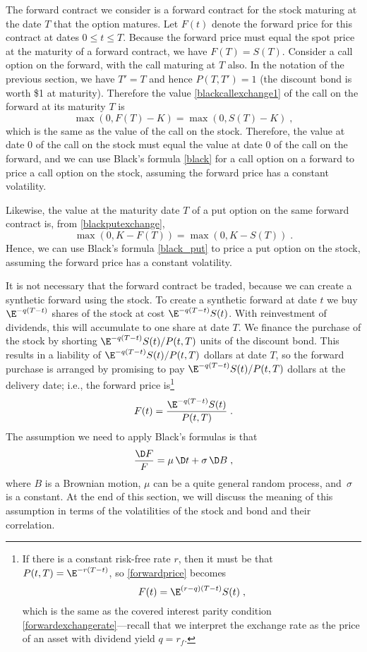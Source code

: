 The forward contract we consider is a forward contract for the stock maturing at the date $T$ that the option matures.  Let $F(t)$ denote the forward price for this contract at dates $0 \leq t\leq T$.  Because the forward price must equal the spot price at the maturity of a forward contract, we have $F(T)=S(T)$.  Consider a call option on the forward, with the call maturing at $T$ also.  In the notation of the previous section, we have $T'=T$ and hence $P(T,T')=1$ (the discount bond is worth \$1 at maturity).  Therefore the value \eqref{blackcallexchange1} of the call on the forward at its maturity $T$ is
$$\max(0,F(T)-K) = \max(0,S(T)-K)\; ,$$
which is the same as the value of the call on the stock.  Therefore, the value at date 0 of the call on the stock must equal the value at date 0 of the call on the forward, and we can use Black's formula \eqref{black} for a call option on a forward to price a call option on the stock, assuming the forward price has a constant volatility. 

Likewise, the value at the maturity date $T$ of a put option on the same forward contract is, from \eqref{blackputexchange},
$$\max(0,K-F(T)) = \max(0,K-S(T))\; .$$
Hence, we can use Black's formula \eqref{black_put} to price a put option on the stock, assuming the forward price has a constant volatility.

It is not necessary that the forward contract be traded, because we can create a synthetic forward using the stock.  To create a synthetic forward at date $t$ we buy $\E^{-q(T-t)}$ shares of the stock at cost $\E^{-q(T-t)}S(t)$.  With reinvestment of dividends, this will accumulate to one share at date $T$.  We finance the purchase of the stock by shorting $\E^{-q(T-t)}S(t)/P(t,T)$ units of the discount bond.  This results in a liability of $\E^{-q(T-t)}S(t)/P(t,T)$ dollars at date $T$, so the forward purchase is arranged by promising to pay $\E^{-q(T-t)}S(t)/P(t,T)$ dollars at the delivery date; i.e., the forward price is\footnote{If there is a constant risk-free rate $r$, then it must be that $P(t,T) = \E^{-r(T-t)}$, so  \eqref{forwardprice} becomes 
$$F(t) = \E^{(r-q)(T-t)}S(t)\; ,$$
which is the same as the covered interest parity condition \eqref{forwardexchangerate}---recall that we interpret the exchange rate as the price of an asset with dividend yield $q=r_f$.}
\begin{equation}\label{forwardprice}
F(t) = \frac{\E^{-q(T-t)}S(t)}{P(t,T)}\;.
\end{equation}
The assumption we need to apply Black's formulas is that
\begin{equation}\label{mertonforward}
\frac{\D F}{F} = \mu\,\D t+\sigma\,\D B\;,
\end{equation}
where $B$ is a Brownian motion, $\mu$ can be a quite general random process, and~$\sigma$ is a constant. At the end of this section, we will discuss the meaning of this assumption in terms of the volatilities of the stock and bond and their correlation.

